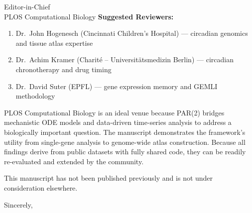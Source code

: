 \documentclass[11pt]{letter}
\begin{document}
\begin{letter}{Editor-in-Chief \\ PLOS Computational Biology}
\textbf{Suggested Reviewers:}

\begin{enumerate}
    \item Dr.~John Hogenesch (Cincinnati Children's Hospital) --- circadian genomics and tissue atlas expertise
    \item Dr.~Achim Kramer (Charit\'{e} -- Universit\"{a}tsmedizin Berlin) --- circadian chronotherapy and drug timing
    \item Dr.~David Suter (EPFL) --- gene expression memory and GEMLI methodology
\end{enumerate}

PLOS Computational Biology is an ideal venue because PAR(2) bridges mechanistic ODE models and data-driven time-series analysis to address a biologically important question. The manuscript demonstrates the framework's utility from single-gene analysis to genome-wide atlas construction. Because all findings derive from public datasets with fully shared code, they can be readily re-evaluated and extended by the community.

This manuscript has not been published previously and is not under consideration elsewhere.

\closing{Sincerely,}

\end{letter}
\end{document}
